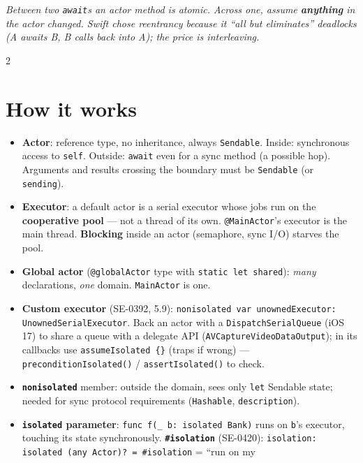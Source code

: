 \documentclass[8pt]{extarticle}
\begin{document}
{\footnotesize\itshape\color{sheetBrown} Between two \texttt{await}s an actor
method is atomic. Across one, assume \textbf{anything} in the actor changed. Swift
chose reentrancy because it ``all but eliminates'' deadlocks (A awaits B, B calls back into A);
the price is interleaving.}

\begin{multicols}{2}
\raggedright

\section{How it works}
\begin{itemize}
  \item \textbf{Actor}: reference type, no inheritance, always \texttt{Sendable}.
        Inside: synchronous access to \texttt{self}. Outside: \texttt{await} even
        for a sync method (a possible hop). Arguments and results crossing the
        boundary must be \texttt{Sendable} (or \texttt{sending}).
  \item \textbf{Executor}: a default actor is a serial executor whose jobs run on
        the \textbf{cooperative pool} — not a thread of its own.
        \texttt{@MainActor}'s executor is the main thread. \textbf{Blocking}
        inside an actor (semaphore, sync I/O) starves the pool.
  \item \textbf{Global actor} (\texttt{@globalActor} type with \texttt{static let shared}):
        \emph{many} declarations, \emph{one} domain. \texttt{MainActor} is one.
  \item \textbf{Custom executor} (SE-0392, 5.9): \texttt{nonisolated var
        unownedExecutor: UnownedSerialExecutor}. Back an actor with a
        \texttt{DispatchSerialQueue} (iOS 17) to share a queue with a delegate
        API (\texttt{AVCaptureVideoDataOutput}); in its callbacks use
        \texttt{assumeIsolated \{\}} (traps if wrong) —
        \texttt{preconditionIsolated()} / \texttt{assertIsolated()} to check.
  \item \textbf{\texttt{nonisolated}} member: outside the domain, sees only
        \texttt{let} Sendable state; needed for sync protocol requirements
        (\texttt{Hashable}, \texttt{description}).
  \item \textbf{\texttt{isolated} parameter}: \texttt{func f(\_ b: isolated Bank)}
        runs on \texttt{b}'s executor, touching its state synchronously.
        \textbf{\texttt{\#isolation}} (SE-0420):
        \texttt{isolation: isolated (any Actor)? = \#isolation} = ``run on my

\end{itemize}
\end{multicols}
\end{document}
